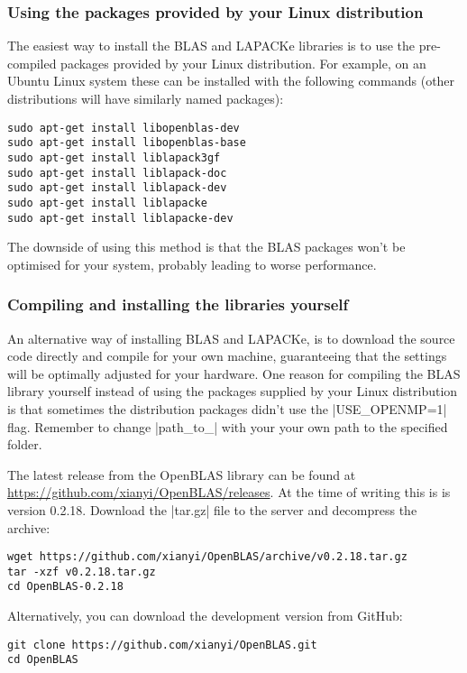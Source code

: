 \subsubsection{Using the packages provided by your Linux distribution}
The easiest way to install the \ac{BLAS} and LAPACKe libraries is to
use the pre-compiled packages provided by your Linux distribution. For
example, on an Ubuntu Linux system these can be installed with the
following commands (other distributions will have similarly named
packages):
\begin{lstlisting}[escapechar=\%]
sudo apt-get install libopenblas-dev
sudo apt-get install libopenblas-base
sudo apt-get install liblapack3gf
sudo apt-get install liblapack-doc
sudo apt-get install liblapack-dev
sudo apt-get install liblapacke
sudo apt-get install liblapacke-dev
\end{lstlisting}
The downside of using this method is that the BLAS packages won't be
optimised for your system, probably leading to worse performance.


\subsubsection{Compiling and installing the libraries yourself}
An alternative way of installing \ac{BLAS} and LAPACKe, is to download
the source code directly and compile for your own machine,
guaranteeing that the settings will be optimally adjusted for your
hardware. One reason for compiling the \ac{BLAS} library yourself
instead of using the packages supplied by your Linux distribution is
that sometimes the distribution packages didn't use the |USE_OPENMP=1|
flag. Remember to change |path_to_| with your your own path to the
specified folder.

The latest release from the OpenBLAS library can be found at
\url{https://github.com/xianyi/OpenBLAS/releases}. At the time of
writing this is is version 0.2.18. Download the |tar.gz| file to the
server and decompress the archive:
\begin{lstlisting}[basicstyle=\footnotesize\ttfamily]
wget https://github.com/xianyi/OpenBLAS/archive/v0.2.18.tar.gz
tar -xzf v0.2.18.tar.gz
cd OpenBLAS-0.2.18
\end{lstlisting}

Alternatively, you can download the development version from GitHub:
\begin{lstlisting}[escapechar=\%]
git clone https://github.com/xianyi/OpenBLAS.git
cd OpenBLAS
\end{lstlisting}

